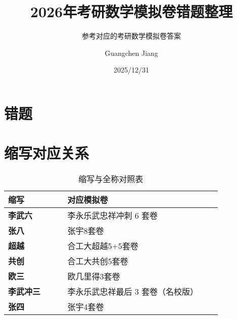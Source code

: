 \documentclass[lang=cn,math=mtpro2,11pt,scheme=chinese]{elegantbook}
\title{2026年考研数学模拟卷错题整理}
\subtitle{参考对应的考研数学模拟卷答案}
\author{Guangchen Jiang}
\date{2025/12/31}
\begin{document}



\chapter{错题}



\chapter{缩写对应关系}

\begin{table}[h!]
\centering
\caption{缩写与全称对照表}
\renewcommand{\arraystretch}{1.3} %
\setlength{\tabcolsep}{10pt} %
\begin{tabular}{>{\bfseries}m{0.25\linewidth} m{0.65\linewidth}}
\toprule
\textbf{缩写} & \textbf{对应模拟卷} \\
\midrule
李武六 & 李永乐武忠祥冲刺 6 套卷 \\
张八 & 张宇8套卷 \\
超越 & 合工大超越5+5套卷 \\
共创 & 合工大共创5套卷 \\
欧三 & 欧几里得3套卷 \\
李武冲三 & 李永乐武忠祥最后 3 套卷（名校版） \\
张四 & 张宇4套卷 \\
\bottomrule
\end{tabular}
\end{table}
\end{document}
